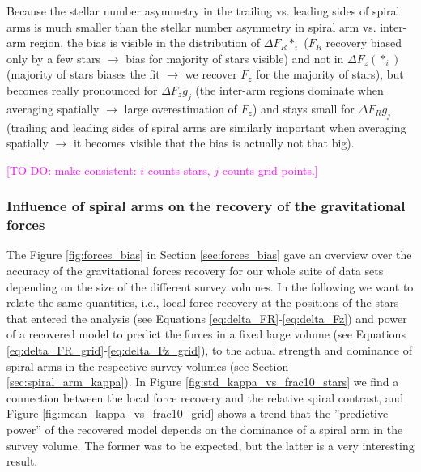 \documentclass[iop,revtex4,numberedappendix,appendixfloats]{emulateapj}
\newcommand{\Wilma}[1]{\textcolor{Magenta}{#1}}
\begin{document}
Because the stellar number asymmetry in the trailing vs. leading sides of spiral arms is much smaller than the stellar number asymmetry in spiral arm vs. inter-arm region, the bias is visible in the distribution of $\Delta F_R{*_i}$ ($F_R$ recovery biased only by a few stars $\longrightarrow$ bias for majority of stars visible) and not in $\Delta F_z(*_i)$ (majority of stars biases the fit $\longrightarrow$ we recover $F_z$ for the majority of stars), but becomes really pronounced for $\Delta F_z{g_j}$ (the inter-arm regions dominate when averaging spatially $\longrightarrow$ large overestimation of $F_z$) and stays small for $\Delta F_R{g_j}$ (trailing and leading sides of spiral arms are similarly important when averaging spatially $\longrightarrow$ it becomes visible that the bias is actually not that big).

\Wilma{[TO DO: make consistent: $i$ counts stars, $j$ counts grid points.]}


\subsubsection{Influence of spiral arms on the recovery of the gravitational forces} \label{sec:spiral_arms_and_forces}

The Figure \ref{fig:forces_bias} in Section \ref{sec:forces_bias} gave an overview over the accuracy of the gravitational forces recovery for our whole suite of data sets depending on the size of the different survey volumes. In the following we want to relate the same quantities, i.e., local force recovery at the positions of the stars that entered the analysis (see Equations \eqref{eq:delta_FR}-\eqref{eq:delta_Fz}) and power of a recovered model to predict the forces in a fixed large volume (see Equations \eqref{eq:delta_FR_grid}-\eqref{eq:delta_Fz_grid}), to the actual strength and dominance of spiral arms in the respective survey volumes (see Section \ref{sec:spiral_arm_kappa}). In Figure \ref{fig:std_kappa_vs_frac10_stars} we find a connection between the local force recovery and the relative spiral contrast, and Figure \ref{fig:mean_kappa_vs_frac10_grid} shows a trend that the ''predictive power'' of the recovered model depends on the dominance of a spiral arm in the survey volume. The former was to be expected, but the latter is a very interesting result.
\end{document}
